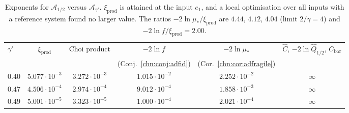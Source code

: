 \begin{table}[!tbp]
\centering
\small
\begin{tabular}{lccccc}
\toprule
$\gamma'$ & $\xi_{\mathrm{prod}}$ & Choi product & $-2\ln f$ & $-2\ln\mu_*$ & $\widehat C$, $-2\ln\widehat Q_{1/2}$, $C_{\mathrm{bar}}$\\
& & & (Conj.~\ref{chn:conj:adfid}) & (Cor.~\ref{chn:cor:adfragile}) & \\
\midrule
$0.40$ & $5.077\cdot10^{-3}$ & $3.272\cdot10^{-3}$ & $1.015\cdot10^{-2}$ & $2.252\cdot10^{-2}$ & $\infty$\\
$0.47$ & $4.506\cdot10^{-4}$ & $2.974\cdot10^{-4}$ & $9.012\cdot10^{-4}$ & $1.858\cdot10^{-3}$ & $\infty$\\
$0.49$ & $5.001\cdot10^{-5}$ & $3.323\cdot10^{-5}$ & $1.000\cdot10^{-4}$ & $2.021\cdot10^{-4}$ & $\infty$\\
\bottomrule
\end{tabular}
\caption{Exponents for $\mathcal A_{1/2}$ versus $\mathcal A_{\gamma'}$. $\xi_{\mathrm{prod}}$ is attained at the input $e_1$, and a local optimisation over all inputs with a reference system found no larger value. The ratios $-2\ln\mu_*/\xi_{\mathrm{prod}}$ are $4.44$, $4.12$, $4.04$ (limit $2/\gamma=4$) and $-2\ln f/\xi_{\mathrm{prod}}=2.00$.}
\label{chn:tab:adexp}
\end{table}

